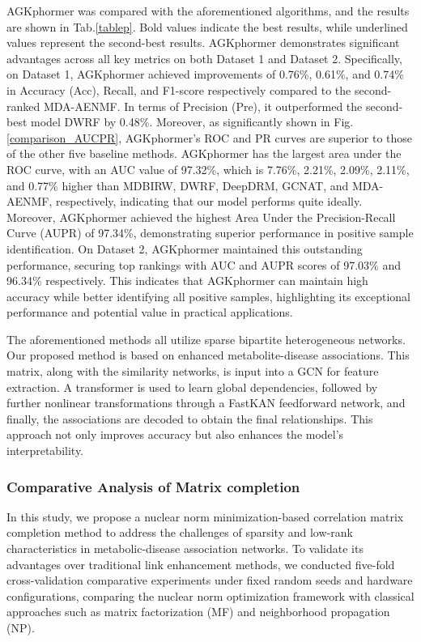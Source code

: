\documentclass[a4paper,fleqn]{cas-dc}
\begin{document}
AGKphormer was compared with the aforementioned algorithms, and the results are shown in Tab.\ref{tablep}. Bold values indicate the best results, while underlined values represent the second-best results. AGKphormer demonstrates significant advantages across all key metrics on both Dataset 1 and Dataset 2. Specifically, on Dataset 1, AGKphormer achieved improvements of 0.76\%, 0.61\%, and 0.74\% in Accuracy (Acc), Recall, and F1-score respectively compared to the second-ranked MDA-AENMF. In terms of Precision (Pre), it outperformed the second-best model DWRF by 0.48\%. Moreover, as significantly shown in Fig.\ref{comparison_AUCPR}, AGKphormer's ROC and PR curves are superior to those of the other five baseline methods. AGKphormer has the largest area under the ROC curve, with an AUC value of 97.32\%, which is 7.76\%, 2.21\%, 2.09\%, 2.11\%, and 0.77\% higher than MDBIRW, DWRF, DeepDRM, GCNAT, and MDA-AENMF, respectively, indicating that our model performs quite ideally. Moreover, AGKphormer achieved the highest Area Under the Precision-Recall Curve (AUPR) of 97.34\%, demonstrating superior performance in positive sample identification. On Dataset 2, AGKphormer maintained this outstanding performance, securing top rankings with AUC and AUPR scores of 97.03\% and 96.34\% respectively. This indicates that AGKphormer can maintain high accuracy while better identifying all positive samples, highlighting its exceptional performance and potential value in practical applications.



The aforementioned methods all utilize sparse bipartite heterogeneous networks. Our proposed method is based on enhanced metabolite-disease associations. This matrix, along with the similarity networks, is input into a GCN for feature extraction. A transformer is used to learn global dependencies, followed by further nonlinear transformations through a FastKAN feedforward network, and finally, the associations are decoded to obtain the final relationships. This approach not only improves accuracy but also enhances the model's interpretability.

\subsubsection{Comparative Analysis of Matrix completion}
In this study, we propose a nuclear norm minimization-based correlation matrix completion method to address the challenges of sparsity and low-rank characteristics in metabolic-disease association networks. To validate its advantages over traditional link enhancement methods, we conducted five-fold cross-validation comparative experiments under fixed random seeds and hardware configurations, comparing the    nuclear norm optimization framework with classical approaches such as matrix factorization (MF) and neighborhood propagation (NP).
\end{document}
